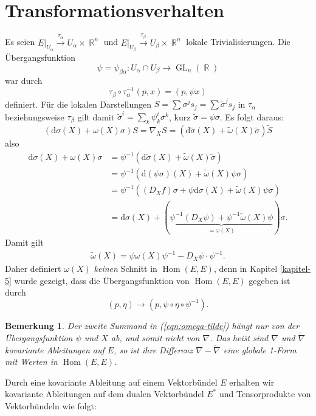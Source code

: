 \documentclass[paper=A4, twoside, chapterprefix=true, bibliography=totoc, headsepline]{scrbook}
\DeclareMathOperator{\R}{\mathbb{R}}
\DeclareMathOperator{\GL}{GL}       %
\DeclareMathOperator{\Hom}{Hom}     %
\newcommand{\dop}{\mathrm{d}}
\newcommand{\X}{\times}
\theoremstyle{plain}
\theoremstyle{nonumberplain}
\newtheorem{bem}{Bemerkung}
\theoremstyle{empty}
\theoremstyle{break}
\begin{document}
\section{Transformationsverhalten}

Es seien $E|_{U_\alpha} \overset{\tau_\alpha}{\to} U_\alpha \X \R^n$ und $E|_{U_\beta} \overset{\tau_\beta}{\to} U_{\beta} \X \R^n$ lokale Trivialisierungen. Die \"Ubergangsfunktion
\[ \psi = \psi_{\beta\alpha}: U_\alpha \cap U_\beta \to \GL_n(\R) \]
war durch
\[ \tau_\beta \circ \tau_\alpha^{-1} (p,x) = (p, \psi x) \]
definiert.
F\"ur die lokalen Darstellungen $S = \sum \sigma^j s_j = \sum \tilde\sigma^j s_j$ in $\tau_\alpha$ beziehungsweise $\tau_\beta$ gilt damit $\tilde\sigma^{i} = \sum_k \psi_k^{i} \sigma^k$, kurz $\tilde\sigma = \psi \sigma$.
Es folgt daraus:
\[ (\dop \sigma(X) + \omega(X) \sigma) S = \nabla_X S = (\dop \tilde\sigma(X) + \tilde\omega(X)\tilde\sigma) \tilde S \]
also
\begin{align*}
  \dop \sigma(X) + \omega(X) \sigma &= \psi^{-1}(\dop \tilde\sigma(X) + \tilde\omega(X) \tilde\sigma)\\
  &= \psi^{-1} (\dop(\psi\sigma)(X) + \tilde\omega(X) \psi \sigma)\\
  &= \psi^{-1} ((D_X f) \sigma + \psi \dop \sigma(X) + \tilde\omega(X) \psi \sigma)\\
  &= \dop \sigma(X) + (\underbrace{\psi^{-1}(D_X \psi) + \psi^{-1} \tilde\omega(X) \psi}_{=\omega(X)}) \sigma.
\end{align*}
Damit gilt
\begin{align}
  \tilde\omega(X) = \psi \omega(X) \psi^{-1} - D_X \psi \cdot \psi^{-1}.\label{eqn:omega-tilde}
\end{align}
Daher definiert $\omega(X)$ \emph{keinen} Schnitt in $\Hom(E, E)$, denn in Kapitel \ref{kapitel-5} wurde gezeigt, dass die \"Ubergangsfunktion von $\Hom(E, E)$ gegeben ist durch
\[ (p, \eta) \to (p, \psi \circ \eta \circ \psi^{-1}). \]

\begin{bem}
  Der zweite Summand in (\ref{eqn:omega-tilde}) h\"angt \emph{nur} von der \"Ubergangsfunktion $\psi$ und $X$ ab, und somit \emph{nicht} von $\nabla$.
  Das hei\"st sind $\nabla$ und $\tilde\nabla$ kovariante Ableitungen auf $E$, so ist ihre Differenz $\nabla - \tilde\nabla$ eine globale 1-Form mit Werten in $\Hom(E,E)$.
\end{bem}

Durch eine kovariante Ableitung auf einem Vektorb\"undel $E$ erhalten wir kovariante Ableitungen auf dem dualen Vektorb\"undel $E^*$ und Tensorprodukte von Vektorb\"undeln wie folgt:
\end{document}
